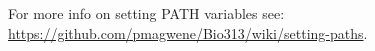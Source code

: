 For more info on setting PATH variables see: \url{https://github.com/pmagwene/Bio313/wiki/setting-paths}.











